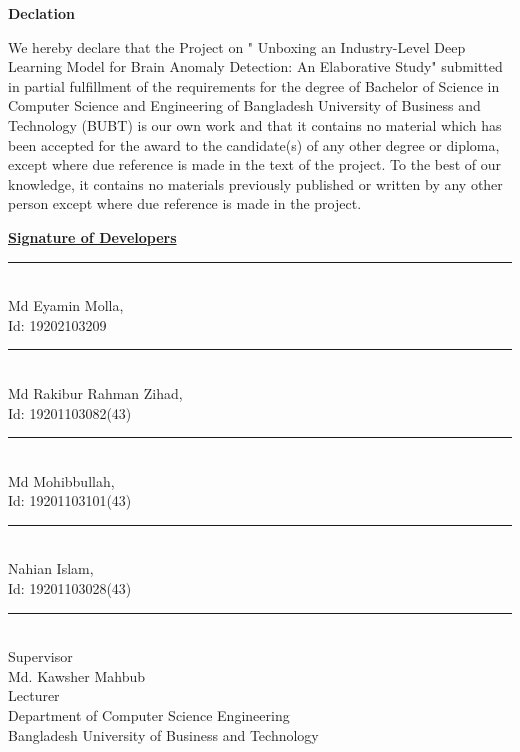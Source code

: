 \begin{center}
    \Huge \textbf{Declation}
\end{center}
\vspace{15mm}
We hereby declare that the Project on " Unboxing an Industry-Level Deep Learning Model for Brain Anomaly Detection: An Elaborative Study" submitted in partial fulfillment of the requirements for the degree of Bachelor of Science in Computer Science and Engineering of Bangladesh University of Business and Technology (BUBT) is our own work and that it contains no material which has been accepted for the award to the candidate(s) of any other degree or diploma, except where due reference is made in the text of the project. To the best of our knowledge, it contains no materials previously published or written by any other person except where due reference is made in the project.

\begin{flushleft}

\textbf{\underline{Signature of Developers}} \null\hfill  

\vspace{10mm}
\noindent\rule{5.3cm}{0.2pt} \\

Md Eyamin Molla, \\ 
Id: 19202103209  \null\hfill 
\vspace{10mm}

\noindent\rule{5.3cm}{0.2pt} \\
Md Rakibur Rahman Zihad, \\ Id: 19201103082(43) \\
\vspace{10mm}

\noindent\rule{5.3cm}{0.2pt} \\
Md Mohibbullah,  \\ 
Id: 19201103101(43) \\
\vspace{10mm}
\noindent\rule{5.3cm}{0.2pt} \\
Nahian Islam,   \\
Id: 19201103028(43)  \\
\vspace{10mm}
\end{flushleft}
\begin{flushright}
    \noindent\rule{5.3cm}{0.2pt} \\
Supervisor \\
Md. Kawsher Mahbub \\
Lecturer \\
Department of Computer Science Engineering \\
Bangladesh University of Business and Technology\\


\end{flushright}
    



